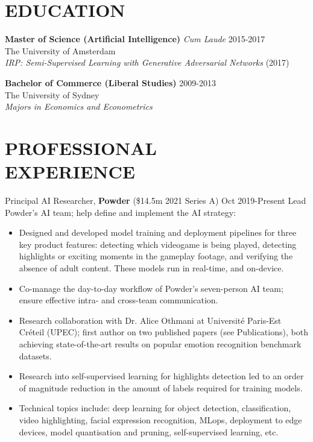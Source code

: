 \documentclass[margin]{res}
\begin{document}
	\begin{resume}
		
		
		\section{EDUCATION} {\bf Master of Science (Artificial Intelligence)} {\sl Cum Laude} \hfill 2015-2017\\
		The University of Amsterdam\\
		{\sl IRP: Semi-Supervised Learning with Generative Adversarial Networks} (2017)
		
		{\bf Bachelor of Commerce (Liberal Studies)} \hfill 2009-2013\\
		The University of Sydney\\
		{\sl Majors in Economics and Econometrics}
		
		\section{PROFESSIONAL \\ EXPERIENCE}
		
		{Principal AI Researcher,} {\bf Powder} (\$14.5m 2021 Series A) \hfill Oct 2019-Present\vspace{2mm}\newline
        Lead Powder's AI team; help define and implement the AI strategy:
		\vspace{1mm}
		\begin{itemize}
			\item Designed and developed model training and deployment pipelines for three key product features: detecting which videogame is being played, detecting highlights or exciting moments in the gameplay footage, and verifying the absence of adult content. These models run in real-time, and on-device.
			\item Co-manage the day-to-day workflow of Powder's seven-person AI team; ensure effective intra- and cross-team communication.
			\item Research collaboration with Dr.  Alice Othmani at Universit\'e Paris-Est Cr\'eteil (UPEC); first author on two published papers (see Publications), both achieving state-of-the-art results on popular emotion recognition benchmark datasets.
			\item Research into self-supervised learning for highlights detection led to an order of magnitude reduction in the amount of labels required for training models.
			\item Technical topics include: deep learning for object detection, classification, video highlighting, facial expression recognition, MLops, deployment to edge devices, model quantisation and pruning, self-supervised learning, etc.
		\end{itemize}
		

\end{resume}
\end{document}
